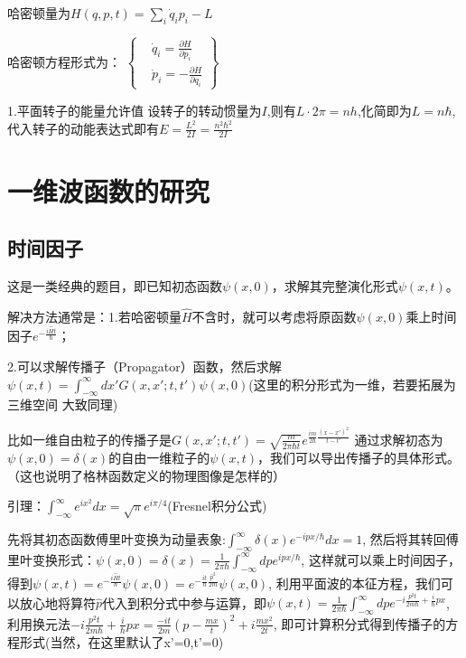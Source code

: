 \documentclass[UTF8,a4paper,10pt]{ctexart}
\begin{document}
哈密顿量为$H(q,p,t)=\sum_{i} \dot q_{i}p_{i} -L$\quad \newline

哈密顿方程形式为：
\(
    \left\{
        \begin{aligned}
        &\text{$\dot q_{i}=\frac{\partial H}{\partial p_{i}}$}  \\
        &\text{$\dot p_{i}=-\frac{\partial H}{\partial q_{i}}$}
        \end{aligned}
    \right\}
\)
    \newline

1.平面转子的能量允许值
设转子的转动惯量为$I$,则有$L\cdot 2\pi=nh$,化简即为$L=n\hbar$,代入转子的动能表达式即有$E=\frac{L^2}{2I}=\frac{n^2\hbar^2}{2I}$

\section{一维波函数的研究}
\subsection{时间因子}
这是一类经典的题目，即已知初态函数$\psi(x,0)$，求解其完整演化形式$\psi(x,t)$。\newline

解决方法通常是：1.若哈密顿量$\hat{H}$不含时，就可以考虑将原函数$\psi(x,0)$乘上时间因子$e^{-\frac{i\hat{H}t}{\hbar}}$；\newline

2.可以求解传播子（Propagator）函数，然后求解$\psi(x,t)=\int_{-\infty}^{\infty}dx'G(x,x';t,t')\psi(x,0)$(这里的积分形式为一维，若要拓展为三维空间
大致同理)\newline

比如一维自由粒子的传播子是$G(x,x';t,t')=\sqrt{\frac{m}{2\pi\hbar t}}e^{\frac{im}{2\hbar}\frac{(x-x')^2}{t-t'}}$
通过求解初态为$\psi(x,0)=\delta(x)$的自由一维粒子的$\psi(x,t)$，我们可以导出传播子的具体形式。（这也说明了格林函数定义的物理图像是怎样的）\newline

引理：$\int_{-\infty}^{\infty}e^{ix^2}dx=\sqrt{\pi}e^{i\pi/4}$(Fresnel积分公式)\newline

先将其初态函数傅里叶变换为动量表象:$\int_{-\infty}^{\infty}\delta(x)e^{-ipx/\hbar}dx=1$,
然后将其转回傅里叶变换形式：$\psi(x,0)=\delta(x)=\frac{1}{2\pi\hbar}\int_{-\infty}^{\infty}dpe^{ipx/\hbar}$,
这样就可以乘上时间因子，得到$\psi(x,t)=e^{-\frac{i\hat{H}t}{\hbar}}\psi(x,0)=e^{-\frac{it}{\hbar}\frac{\hat{p}^2}{2m}}\psi(x,0)$,
利用平面波的本征方程，我们可以放心地将算符$\hat{p}$代入到积分式中参与运算，即$\psi(x,t)=\frac{1}{2\pi\hbar}\int_{-\infty}^{\infty}dpe^{-i\frac{p^2t}{2m\hbar}+\frac{i}{\hbar}px}$,
利用换元法$-i\frac{p^2t}{2m\hbar}+\frac{i}{\hbar}px=\frac{-it}{2m}(p-\frac{mx}{t})^2+i\frac{mx^2}{2t}$,
即可计算积分式得到传播子的方程形式(当然，在这里默认了x'=0,t'=0)\newline
\end{document}
